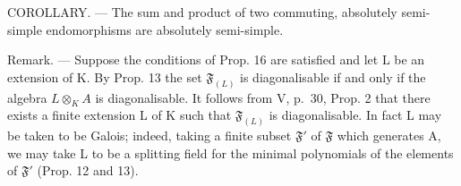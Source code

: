 COROLLARY. --- The sum and product of two commuting, absolutely semi-simple endomorphisms are absolutely semi-simple.

Remark. --- Suppose the conditions of Prop. 16 are satisfied and let L be an extension of K. By Prop. 13 the set \(\mathfrak{F}_{(L)}\) is diagonalisable if and only if the algebra \(L \otimes_K A\) is diagonalisable. It follows from V, p.~30, Prop. 2 that there exists a finite extension L of K such that \(\mathfrak{F}_{(L)}\) is diagonalisable. In fact L may be taken to be Galois; indeed, taking a finite subset \(\mathfrak{F}'\) of \(\mathfrak{F}\) which generates A, we may take L to be a splitting field for the minimal polynomials of the elements of \(\mathfrak{F}'\) (Prop. 12 and 13).

